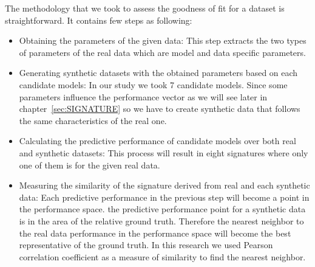 The methodology that we took to assess the goodness of fit for a dataset is straightforward. It contains few steps as following:
\begin{itemize}
\item Obtaining the parameters of the given data: This step extracts the two types of parameters of the real data which are model and data specific parameters. 
\item Generating synthetic datasets with the obtained parameters based on each candidate models: In our study we took 7 candidate models. Since some parameters influence the performance vector as we will see later in chapter~\ref{sec:SIGNATURE} so we have to create synthetic data that follows the same characteristics of the real one.

\item Calculating the predictive performance of candidate models over both real and synthetic datasets: This process will result in eight signatures where only one of them is for the given real data.
\item Measuring the similarity of the signature derived from real and each synthetic data: Each predictive performance in the previous step will become a point in the performance space. the predictive performance point for a synthetic data is in the area of the relative ground truth. Therefore the nearest neighbor to the real data performance in the performance space will become the best representative of the ground truth. In this research we used Pearson correlation coefficient as a measure of similarity to find the nearest neighbor.
\end{itemize}



